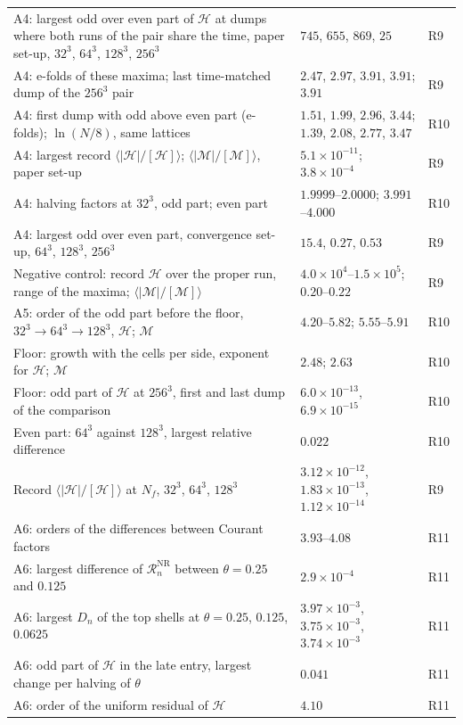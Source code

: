 \begin{table}
\begin{ruledtabular}
\begin{tabular}{p{}p{}p{}}
A4: largest odd over even part of $\mathcal{H}$ at dumps where both runs of the pair share the time, paper set-up, $32^3$, $64^3$, $128^3$, $256^3$ & $745$, $655$, $869$, $25$ & R9 \\
A4: e-folds of these maxima; last time-matched dump of the $256^3$ pair & $2.47$, $2.97$, $3.91$, $3.91$; $3.91$ & R9 \\
A4: first dump with odd above even part (e-folds); $\ln(N/8)$, same lattices & $1.51$, $1.99$, $2.96$, $3.44$; $1.39$, $2.08$, $2.77$, $3.47$ & R10 \\
A4: largest record $\langle|\mathcal{H}|/[\mathcal{H}]\rangle$; $\langle|\mathcal{M}|/[\mathcal{M}]\rangle$, paper set-up & $5.1\times10^{-11}$; $3.8\times10^{-4}$ & R9 \\
A4: halving factors at $32^3$, odd part; even part & $1.9999$--$2.0000$; $3.991$--$4.000$ & R10 \\
A4: largest odd over even part, convergence set-up, $64^3$, $128^3$, $256^3$ & $15.4$, $0.27$, $0.53$ & R9 \\
Negative control: record $\mathcal{H}$ over the proper run, range of the maxima; $\langle|\mathcal{M}|/[\mathcal{M}]\rangle$ & $4.0\times10^{4}$--$1.5\times10^{5}$; $0.20$--$0.22$ & R9 \\
A5: order of the odd part before the floor, $32^3\to64^3\to128^3$, $\mathcal{H}$; $\mathcal{M}$ & $4.20$--$5.82$; $5.55$--$5.91$ & R10 \\
Floor: growth with the cells per side, exponent for $\mathcal{H}$; $\mathcal{M}$ & $2.48$; $2.63$ & R10 \\
Floor: odd part of $\mathcal{H}$ at $256^3$, first and last dump of the comparison & $6.0\times10^{-13}$, $6.9\times10^{-15}$ & R10 \\
Even part: $64^3$ against $128^3$, largest relative difference & $0.022$ & R10 \\
Record $\langle|\mathcal{H}|/[\mathcal{H}]\rangle$ at $N_f$, $32^3$, $64^3$, $128^3$ & $3.12\times10^{-12}$, $1.83\times10^{-13}$, $1.12\times10^{-14}$ & R9 \\
A6: orders of the differences between Courant factors & $3.93$--$4.08$ & R11 \\
A6: largest difference of $\mathcal{R}^\mathrm{NR}_n$ between $\theta=0.25$ and $0.125$ & $2.9\times10^{-4}$ & R11 \\
A6: largest $D_n$ of the top shells at $\theta=0.25$, $0.125$, $0.0625$ & $3.97\times10^{-3}$, $3.75\times10^{-3}$, $3.74\times10^{-3}$ & R11 \\
A6: odd part of $\mathcal{H}$ in the late entry, largest change per halving of $\theta$ & $0.041$ & R11 \\
A6: order of the uniform residual of $\mathcal{H}$ & $4.10$ & R11 \\
\end{tabular}
\end{ruledtabular}
\end{table}

